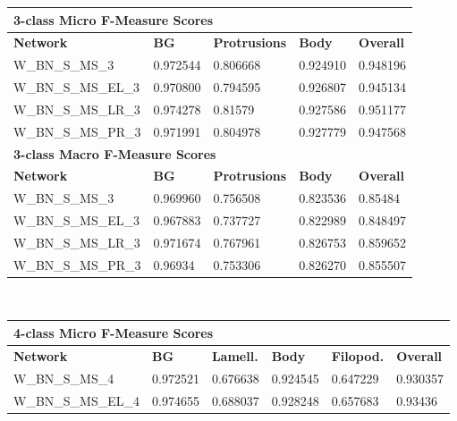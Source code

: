 \begin {table}
	\begin{flushleft}
		\begin {tabular}[!htb]{|l|l|l|l|l|}
			\hline\multicolumn{5}{|l|}{\textbf{3-class Micro F-Measure Scores}} \\ \hline
			\textbf{Network}& \textbf{BG}& \textbf{Protrusions}& \textbf{Body}& \textbf{Overall} \\ \hline
			W\_BN\_S\_MS\_3& 0.972544& 0.806668& 0.924910& 0.948196 \\ \hline
			W\_BN\_S\_MS\_EL\_3& 0.970800& 0.794595& 0.926807& 0.945134 \\ \hline
			W\_BN\_S\_MS\_LR\_3& \cellcolor{green!25}0.974278& \cellcolor{green!25}0.81579& 0.927586& \cellcolor{green!25}0.951177 \\ \hline
			W\_BN\_S\_MS\_PR\_3& 0.971991& 0.804978& \cellcolor{green!25}0.927779& 0.947568 \\ \hline
			\multicolumn{5}{|l|}{\textbf{3-class Macro F-Measure Scores}} \\ \hline
			\textbf{Network}& \textbf{BG}& \textbf{Protrusions}& \textbf{Body}& \textbf{Overall} \\ \hline
			W\_BN\_S\_MS\_3& 0.969960& 0.756508& 0.823536& 0.85484 \\ \hline
			W\_BN\_S\_MS\_EL\_3& 0.967883& 0.737727& 0.822989& 0.848497 \\ \hline
			W\_BN\_S\_MS\_LR\_3& \cellcolor{green!25}0.971674& \cellcolor{green!25}0.767961& \cellcolor{green!25}0.826753& \cellcolor{green!25}0.859652 \\ \hline
			W\_BN\_S\_MS\_PR\_3& 0.96934& 0.753306& 0.826270& 0.855507 \\ \hline
		\end {tabular}
		\vspace{0.5cm}\\
		\begin {tabular}[!htb]{|l|l|l|l|l|l|}
			\hline\multicolumn{6}{|l|}{\textbf{4-class Micro F-Measure Scores}} \\ \hline
			\textbf{Network}& \textbf{BG}& \textbf{Lamell.}& \textbf{Body}& \textbf{Filopod.}& \textbf{Overall} \\ \hline
			W\_BN\_S\_MS\_4& 0.972521& 0.676638& 0.924545& 0.647229& 0.930357 \\ \hline
			W\_BN\_S\_MS\_EL\_4& \cellcolor{green!25}0.974655& \cellcolor{green!25}0.688037& \cellcolor{green!25}0.928248& \cellcolor{green!25}0.657683& \cellcolor{green!25}0.93436 \\ \hline

\end{tabular}
\end{flushleft}
\end{table}
